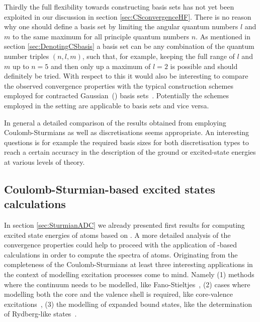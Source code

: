 Thirdly the full flexibility towards constructing \CS basis sets has not yet
been exploited in our discussion in section \vref{sec:CSconvergenceHF}.
There is no reason why one should define a basis set
by limiting the angular quantum numbers $l$ and $m$ to the same maximum for all
principle quantum numbers $n$.
As mentioned in section \vref{sec:DenotingCSbasis} a \CS basis set can be any
combination of the quantum number triples $(n, l, m)$,
such that, for example, keeping the full range of $l$ and $m$
up to $n=5$ and then only up a maximum of $l=2$ is possible
and should definitely be tried.
With respect to this it would also be interesting to compare the
observed convergence properties with the typical construction schemes
employed for contracted Gaussian~(\cGTO) basis sets~\cite{Jensen2013,Hill2013}.
Potentially the schemes employed in the \cGTO setting are applicable
to \CS basis sets and vice versa.

In general a detailed comparison of the results obtained
from employing Coulomb-Sturmians as well as \cGTO discretisations seems appropriate.
An interesting questions is for example the required basis sizes for both
discretisation types to reach a certain accuracy
in the description of the ground or excited-state energies
at various levels of theory.

\subsection{Coulomb-Sturmian-based excited states calculations}
In section \vref{sec:SturmianADC} we already presented
first results for computing excited state energies of atoms based on \ADC.
A more detailed analysis of the convergence properties
could help to proceed with the application of \CS-based \ADC
calculations in order to compute the spectra of atoms.
Originating from the completeness of the Coulomb-Sturmians
at least three interesting applications in the context of modelling
excitation processes come to mind. Namely
(1) methods where the continuum needs to be modelled,
like Fano-Stieltjes~,
(2) cases where modelling both the core and the valence shell is required,
like core-valence excitations~,
(3) the modelling of expanded bound states,
like the determination of Rydberg-like states~.

